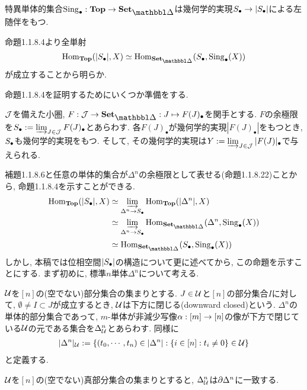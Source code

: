 \documentclass[uplatex, a4paper, 14Q, dvipdfmx]{jsreport}
\begin{document}
\begin{cor}
  特異単体的集合$\Sing_\bullet: \Top \to \sset$は幾何学的実現$\S \to |\S|$による左随伴をもつ. 
\end{cor}

\begin{Proof}
  命題1.1.8.4より全単射
  \begin{align*}
    \Hom_{\Top}(|\S|,X) \simeq \Hom_{\sset}(\S,\Sing_\bullet(X))
  \end{align*}
  が成立することから明らか. 
\end{Proof}

命題1.1.8.4を証明するためにいくつか準備をする. 

\begin{lemma}
  $\calJ$を備えた小圏, $F: \calJ \to \sset: J \mt F(J)_\bullet$を関手とする.
  $F$の余極限を$\S := \varinjlim_{J \in \calJ} F(J)_\bullet$とあらわす. 
  各$F(J)_\bullet$が幾何学的実現$|F(J)_\bullet|$をもつとき, $\S$も幾何学的実現をもつ. 
  そして, その幾何学的実現は$Y:=\varinjlim_{J \in \calJ}|F(J)|_\bullet$で与えられる. 
\end{lemma}

補題1.1.8.6と任意の単体的集合が$\Delta^n$の余極限として表せる(命題1.1.8.22)ことから, 命題1.1.8.4を示すことができる. 
\begin{align*}
  \Hom_{\Top}(|\S|,X) 
  &\simeq \varinjlim_{\Delta^n \to \S} \Hom_{\Top}(|\Delta^n|,X) \\
  &\simeq \varinjlim_{\Delta^n \to \S} \Hom_{\sset}(\Delta^n,\Sing_\bullet(X)) \\
  &\simeq \Hom_{\sset} (\S,\Sing_\bullet(X))
\end{align*}
しかし, 本稿では位相空間$|\S|$の構造について更に述べてから, この命題を示すことにする. 
まず初めに, 標準$n$単体$\Delta^n$について考える. 

\begin{nota}
  $\calU$を$[n]$の(空でない)部分集合の集まりとする. 
  $J \in \calU$と$[n]$の部分集合$I$に対して, $\emptyset \neq I \subset J $が成立するとき, $\calU$は下方に閉じる(downward closed)という. 
  $\Delta^n$の単体的部分集合であって, $m$-単体が非減少写像$\al: [m] \to [n]$の像が下方で閉じている$\calU$の元である集合を$\Delta^n_\calU$とあらわす.
  同様に
  \begin{align*}
    |\Delta^n|_\calU 
    := \{(t_0,\cdots,t_n) \in |\Delta^n|: \{i \in [n]: t_i \neq 0\} \in \calU\}
  \end{align*}
  と定義する.
\end{nota}

\begin{example}
  $\calU$を$[n]$の(空でない)真部分集合の集まりとすると, $\Delta^n_\calU$は$\del \Delta^n$に一致する.
\end{example}
\end{document}
